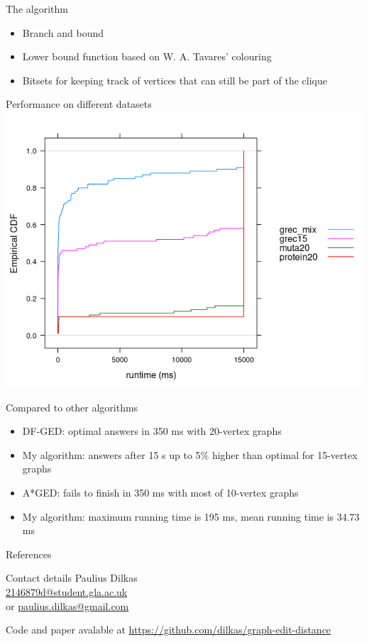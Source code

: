 \documentclass{beamer}
\begin{document}
\begin{frame}{The algorithm}
  \begin{itemize}
  \item Branch and bound
  \item Lower bound function based on W. A. Tavares' colouring \cite{DBLP:phd/hal/tavares16}
  \item Bitsets for keeping track of vertices that can still be part of the clique
  \end{itemize}
\end{frame}
\begin{frame}{Performance on different datasets}
  \includegraphics[scale=0.6]{../ecdfs.png}
\end{frame}
\begin{frame}{Compared to other algorithms \cite{DBLP:conf/icpram/Abu-AishehRRM15}}
  \begin{itemize}
  \item DF-GED: optimal answers in 350 ms with 20-vertex graphs
  \item My algorithm: answers after 15 s up to 5\% higher than optimal for 15-vertex graphs
  \end{itemize}
  \begin{itemize}
  \item A*GED: fails to finish in 350 ms with most of 10-vertex graphs
  \item My algorithm: maximum running time is 195 ms, mean running time is 34.73 ms
  \end{itemize}
\end{frame}
\begin{frame}[allowframebreaks]{References}
  \printbibliography
\end{frame}
\begin{frame}
  \begin{block}{Contact details}
    Paulius Dilkas \\
    \url{2146879d@student.gla.ac.uk} \\
    or \url{paulius.dilkas@gmail.com}
  \end{block}
  \bigskip
  \begin{block}{Code and paper avalable at}
    \url{https://github.com/dilkas/graph-edit-distance}
  \end{block}
\end{frame}
\end{document}
